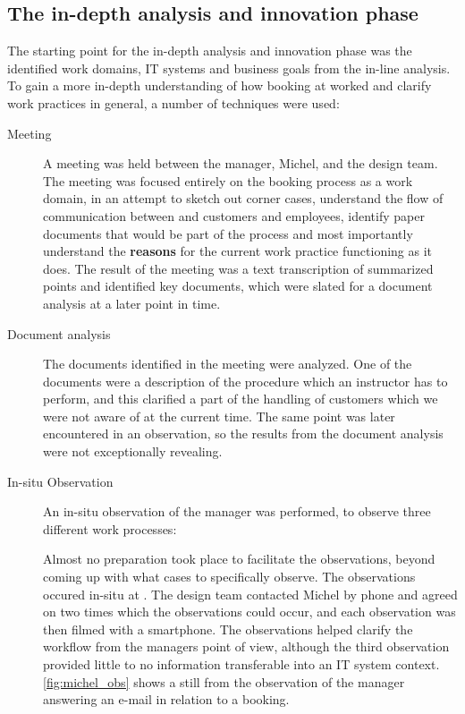 \subsection{The in-depth analysis and innovation phase}
The starting point for the in-depth analysis and innovation phase was the
identified work domains, IT systems and business goals from the in-line
analysis.  To gain a more in-depth understanding of how booking at \gomonkey{}
worked and clarify work practices in general, a number of techniques were used:

\begin{description}
    \item [Meeting] A meeting was held
        between the manager, Michel, and the design team. The meeting was
        focused entirely on the booking process as a work domain, in an attempt
        to sketch out corner cases, understand the flow of communication between
        \gomonkey{} and customers and employees, identify paper documents that
        would be part of the process and most importantly understand the
        \textbf{reasons} for the current work practice functioning as it does.
        The result of the meeting was a text transcription of summarized points
        and identified key documents, which were slated for a document analysis
        at a later point in time. 

    \item [Document analysis] The documents identified in the meeting were
        analyzed. One of the documents were a description of the procedure
	which an instructor has to perform, and this clarified a part of the
	handling of customers which we were not aware of at the current time. 
	The same point was later encountered in an observation, so the results 
	from the document analysis were not exceptionally revealing.

    \item [In-situ Observation] An in-situ observation of the manager was performed,
        to observe three different work processes: 
        Almost no preparation took place to facilitate the observations, beyond
        coming up with what cases to specifically observe. The observations
        occured in-situ at \gomonkey{}. The design team contacted Michel by
        phone and agreed on two times which the observations could occur, and
        each observation was then filmed with a smartphone. The observations
        helped clarify the workflow from the managers point of view, although
        the third observation provided little to no information transferable
        into an IT system context. \autoref{fig:michel_obs} shows a still from
        the observation of the manager answering an e-mail in relation to a
        booking.


\end{description}
